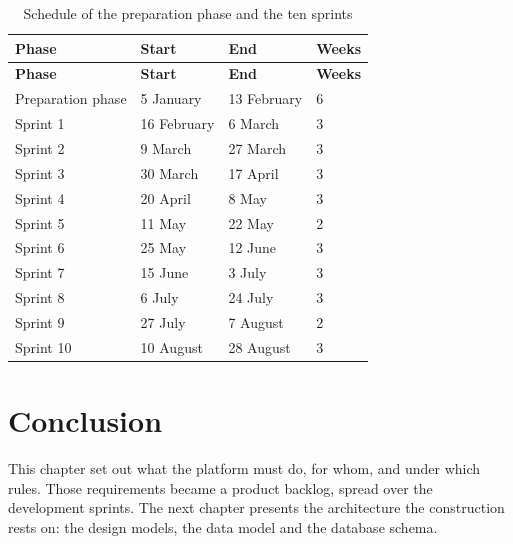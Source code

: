\begin{longtable}{|m{4.0cm}|m{3.0cm}|m{3.0cm}|m{1.8cm}|}
\caption{Schedule of the preparation phase and the ten sprints}\label{tab:schedule}\\
\hline
\textbf{Phase} & \textbf{Start} & \textbf{End} & \textbf{Weeks} \\
\hline
\endfirsthead
\hline
\textbf{Phase} & \textbf{Start} & \textbf{End} & \textbf{Weeks} \\
\hline
\endhead
\endfoot
\endlastfoot
\hline
Preparation phase & 5 January & 13 February & 6 \\
\hline
Sprint 1 & 16 February & 6 March & 3 \\
\hline
Sprint 2 & 9 March & 27 March & 3 \\
\hline
Sprint 3 & 30 March & 17 April & 3 \\
\hline
Sprint 4 & 20 April & 8 May & 3 \\
\hline
Sprint 5 & 11 May & 22 May & 2 \\
\hline
Sprint 6 & 25 May & 12 June & 3 \\
\hline
Sprint 7 & 15 June & 3 July & 3 \\
\hline
Sprint 8 & 6 July & 24 July & 3 \\
\hline
Sprint 9 & 27 July & 7 August & 2 \\
\hline
Sprint 10 & 10 August & 28 August & 3 \\
\hline
\end{longtable}

\section*{Conclusion}
This chapter set out what the platform must do, for whom, and under which rules. Those
requirements became a product backlog, spread over the development sprints. The next chapter
presents the architecture the construction rests on: the design models, the data model and the
database schema.

